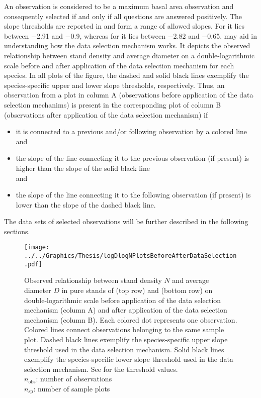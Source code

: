 An observation is considered to be a maximum basal area observation and consequently selected if and only if all questions are answered positively.  The slope thresholds are reported in  and form a range of allowed slopes.  For \Beech{} it lies between \num{-2.91} and \num{-0.9}, whereas for \Spruce{} it lies between \num{-2.82} and \num{-0.65}.
 may aid in understanding how the data selection mechanism works.  It depicts the observed relationship between stand density and average diameter on a double-logarithmic scale before and after application of the data selection mechanism for each species.  In all plots of the figure, the dashed and solid black lines exemplify the species-specific upper and lower slope thresholds, respectively.  Thus, an observation from a plot in column A (observations before application of the data selection mechanims) is present in the corresponding plot of column B (observations after application of the data selection mechanism) if
\begin{itemize}
\item it is connected to a previous and/or following observation by a colored line \\
  and
\item the slope of the line connecting it to the previous observation (if present) is higher than the slope of the solid black line \\
  and
\item the slope of the line connecting it to the following observation (if present) is lower than the slope of the dashed black line.
\end{itemize}

The data sets of selected observations will be further described in the following sections.

\begin{figure}[h]
  \centering
  \texttt{[image: ../../Graphics/Thesis/logDlogNPlotsBeforeAfterDataSelection.pdf]}
  \caption{Observed relationship between stand density \(N\) and average diameter \(D\) in pure stands of \Beech{} (top row) and \Spruce{} (bottom row) on double-logarithmic scale before application of the data selection mechanism (column A) and after application of the data selection mechanism (column B).  Each colored dot represents one observation.  Colored lines connect observations belonging to the same sample plot.  Dashed black lines exemplify the species-specific upper slope threshold used in the data selection mechanism.  Solid black lines exemplify the species-specific lower slope threshold used in the data selection mechanism.  See  for the threshold values.  \\
    \(n_{\text{obs}}\): number of observations \\
    \(n_{\text{sp}}\): number of sample plots}
  \label{fig:logDlogNPlotsBeforeAfterDataSelection}
\end{figure}

